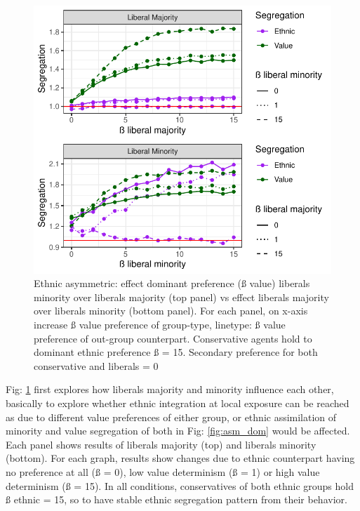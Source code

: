 \documentclass[
]{article}
\begin{document}
\begin{figure}[H]

{\centering \includegraphics[width=1\linewidth]{ev_rum_files/figure-latex/asm_lib_lib-1} 

}

\caption{Ethnic asymmetric: effect dominant preference (ß value) liberals minority over liberals majority (top panel) vs effect liberals majority over liberals minority (bottom panel). For each panel, on x-axis increase ß value preference of group-type, linetype: ß value preference of out-group counterpart. Conservative agents hold to dominant ethnic preference ß = 15. Secondary preference for both conservative and liberals = 0}\label{fig:asm_lib_lib}
\end{figure}

Fig: \ref{fig:asm_lib_lib} first explores how liberals majority and
minority influence each other, basically to explore whether ethnic
integration at local exposure can be reached as due to different value
preferences of either group, or ethnic assimilation of minority and
value segregation of both in Fig: \ref{fig:asm_dom} would be affected.
Each panel shows results of liberals majority (top) and liberals
minority (bottom). For each graph, results show changes due to ethnic
counterpart having no preference at all (ß = 0), low value determinism
(ß = 1) or high value determinism (ß = 15). In all conditions,
conservatives of both ethnic groups hold ß ethnic = 15, so to have
stable ethnic segregation pattern from their behavior.
\end{document}
